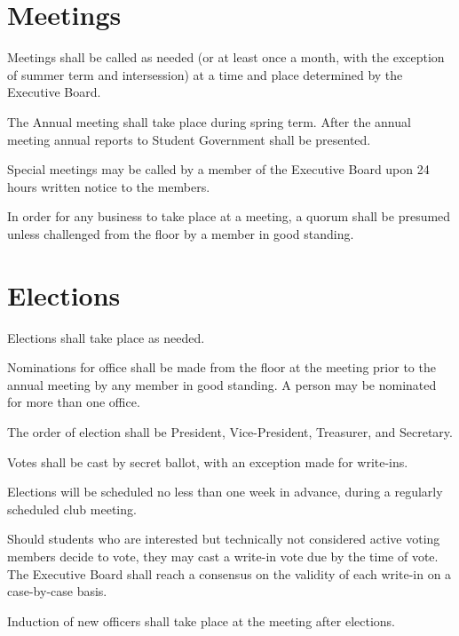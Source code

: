 \section{Meetings}
\begin{subroutines}
\item Meetings shall be called as needed (or at least once a month, with the exception of summer term and intersession) at a time and place determined by the Executive Board.
\item The Annual meeting shall take place during spring term. After the annual meeting annual reports to Student Government shall be presented.
\item Special meetings may be called by a member of the Executive Board upon 24 hours written notice to the members.
\item In order for any business to take place at a meeting, a quorum shall be presumed unless challenged from the floor by a member in good standing.
\end{subroutines}

\section{Elections}
\begin{subroutines}
\item Elections shall take place as needed.
\item Nominations for office shall be made from the floor at the meeting prior to the annual meeting by any member in good standing. A person may be nominated for more than one office.
\item The order of election shall be President, Vice-President, Treasurer, and Secretary.
\item Votes shall be cast by secret ballot, with an exception made for write-ins.
\item Elections will be scheduled no less than one week in advance, during a regularly scheduled club meeting.
\item Should students who are interested but technically not considered active voting members decide to vote, they may cast a write-in vote due by the time of vote. The Executive Board shall reach a consensus on the validity of each write-in on a case-by-case basis.
\item Induction of new officers shall take place at the meeting after elections.
\end{subroutines}

